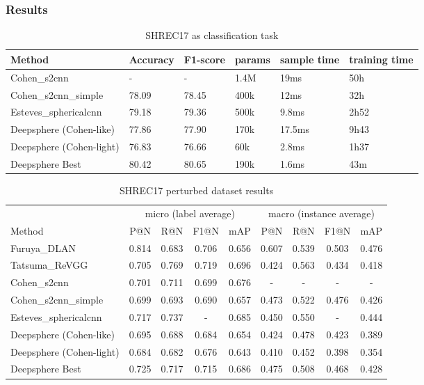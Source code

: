 \documentclass[11pt]{report}
\begin{document}
\subsubsection{Results}
\begin{table}[ht]
    \centering
    \begin{tabular}{l|l l|l l l}
        Method & Accuracy & F1-score & params & sample time & training time \\ \hline
        Cohen\_s2cnn & - & - & 1.4M & 19ms & 50h\\
        Cohen\_s2cnn\_simple & 78.09 & 78.45 & 400k & 12ms & 32h\\
        Esteves\_sphericalcnn & 79.18 & 79.36 & 500k & 9.8ms & 2h52\\ \hline
        Deepsphere (Cohen-like) & 77.86 & 77.90 & 170k & 17.5ms & 9h43\\
        Deepsphere (Cohen-light) & 76.83 & 76.66 & 60k & 2.8ms & 1h37\\
        Deepsphere Best & 80.42 & 80.65 & 190k & 1.6ms & 43m
    \end{tabular}
    \caption{SHREC17 as classification task}
    \label{tab:SHREC17_class}
\end{table}

\begin{table}[ht]
    \centering
    \begin{tabular}{l|c c c c|c c c c}
         & \multicolumn{4}{c|}{micro (label average)} & \multicolumn{4}{c}{macro (instance average)} \\
        Method & P@N & R@N & F1@N & mAP & P@N & R@N & F1@N & mAP \\ \hline
        Furuya\_DLAN & 0.814 & 0.683 & 0.706 & 0.656 & 0.607 & 0.539 & 0.503 & 0.476 \\
        Tatsuma\_ReVGG & 0.705 & 0.769 & 0.719 & 0.696 & 0.424 & 0.563 & 0.434 & 0.418\\ \hline
        Cohen\_s2cnn & 0.701 & 0.711 & 0.699 & 0.676 & - & - & - & - \\
        Cohen\_s2cnn\_simple & 0.699 & 0.693 & 0.690 & 0.657 & 0.473 & 0.522 & 0.476 & 0.426\\
        Esteves\_sphericalcnn & 0.717 & 0.737 & - & 0.685 & 0.450 & 0.550 & - & 0.444\\ \hline
        Deepsphere (Cohen-like) & 0.695 & 0.688 & 0.684 & 0.654 & 0.424 & 0.478 & 0.423 & 0.389\\
        Deepsphere (Cohen-light) & 0.684 & 0.682 & 0.676 & 0.643 & 0.410 & 0.452 & 0.398 & 0.354 \\
        Deepsphere Best & 0.725 & 0.717 & 0.715 & 0.686 & 0.475 & 0.508 & 0.468 & 0.428
    \end{tabular}
    \caption{SHREC17 perturbed dataset results}
    \label{tab:SHREC17_retriev}
\end{table}
\end{document}
